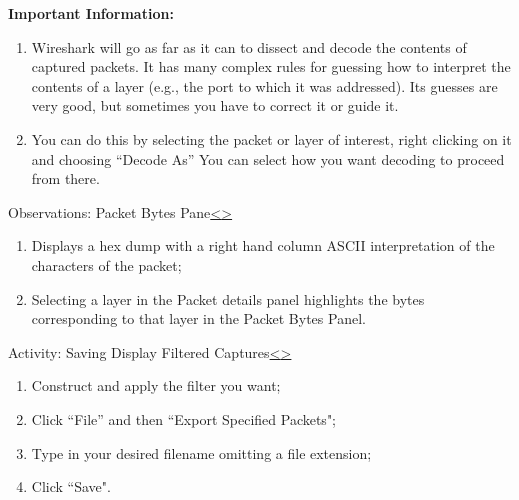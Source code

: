 \documentclass[12pt]{extarticle}
\newenvironment{instructionblock}{\Large\bgroup}{\egroup}
\newcommand{\ben}{\begin{enumerate}}
\newcommand{\een}{\end{enumerate}}
\begin{document}
	\vspace{2mm}
	\noindent
	\textbf{Important Information:}
	
	\ben
	
	\item Wireshark will go as far as it can to dissect and decode the contents of captured packets.  It has many complex rules for guessing how to interpret the contents of a layer  (e.g., the port to which it was addressed).  Its guesses are very good, but sometimes you have to correct it or guide it.  
	
	\item You can do this by selecting the packet or layer of interest, right clicking on it and choosing ``Decode As''  You can select how you want decoding to proceed from there.
	
	\een
	
	
	
	\pagebreak
	\begin{slide}{Observations: Packet Bytes Pane}{\hyperref[slide 16]{\textless}\hyperref[slide 18]{\textgreater}}
		\vskip 5pt
		\begin{instructionblock}
			\begin{enumerate}
				\item Displays a hex dump with a right hand column ASCII interpretation of the characters of the packet;
				\item Selecting a layer in the Packet details panel highlights the bytes corresponding to that layer in the Packet Bytes Panel.
			\end{enumerate}
		\end{instructionblock}
	\end{slide}
	
	
	
	
	\pagebreak
	\begin{slide}{Activity: Saving Display Filtered Captures}{\hyperref[slide 17]{\textless}\hyperref[slide 19]{\textgreater}}
	\vskip 5pt
		\begin{instructionblock}
			\begin{enumerate}
				\item Construct and apply the filter you want; 
				\item Click ``File'' and then ``Export Specified Packets";
				\item Type in your desired filename omitting a file extension;
				\item Click ``Save".
			\end{enumerate}
		\end{instructionblock}
	\end{slide}
	
\end{document}
